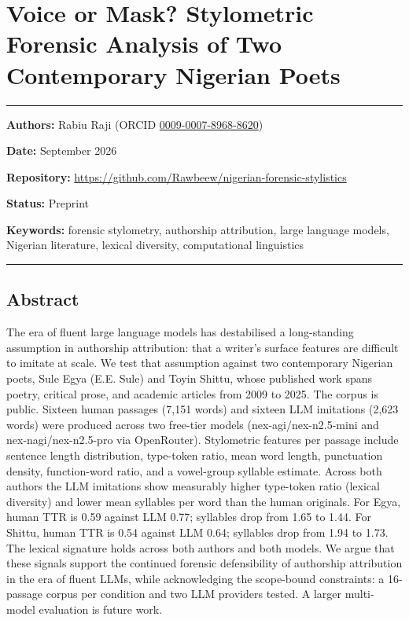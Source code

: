 \section{Voice or Mask? Stylometric Forensic Analysis of Two
Contemporary Nigerian
Poets}\label{voice-or-mask-stylometric-forensic-analysis-of-two-contemporary-nigerian-poets}

\begin{center}\rule{0.5\linewidth}{0.5pt}\end{center}

\textbf{Authors:} Rabiu Raji (ORCID
\href{https://orcid.org/0009-0007-8968-8620}{0009-0007-8968-8620})

\textbf{Date:} September 2026

\textbf{Repository:}
\url{https://github.com/Rawbeew/nigerian-forensic-stylistics}

\textbf{Status:} Preprint

\textbf{Keywords:} forensic stylometry, authorship attribution, large
language models, Nigerian literature, lexical diversity, computational
linguistics

\begin{center}\rule{0.5\linewidth}{0.5pt}\end{center}

\subsection{Abstract}\label{abstract}

The era of fluent large language models has destabilised a long-standing
assumption in authorship attribution: that a writer's surface features
are difficult to imitate at scale. We test that assumption against two
contemporary Nigerian poets, Sule Egya (E.E. Sule) and Toyin Shittu,
whose published work spans poetry, critical prose, and academic articles
from 2009 to 2025. The corpus is public. Sixteen human passages (7,151
words) and sixteen LLM imitations (2,623 words) were produced across two
free-tier models (nex-agi/nex-n2.5-mini and nex-nagi/nex-n2.5-pro via
OpenRouter). Stylometric features per passage include sentence length
distribution, type-token ratio, mean word length, punctuation density,
function-word ratio, and a vowel-group syllable estimate. Across both
authors the LLM imitations show measurably higher type-token ratio
(lexical diversity) and lower mean syllables per word than the human
originals. For Egya, human TTR is 0.59 against LLM 0.77; syllables drop
from 1.65 to 1.44. For Shittu, human TTR is 0.54 against LLM 0.64;
syllables drop from 1.94 to 1.73. The lexical signature holds across
both authors and both models. We argue that these signals support the
continued forensic defensibility of authorship attribution in the era of
fluent LLMs, while acknowledging the scope-bound constraints: a
16-passage corpus per condition and two LLM providers tested. A larger
multi-model evaluation is future work.

